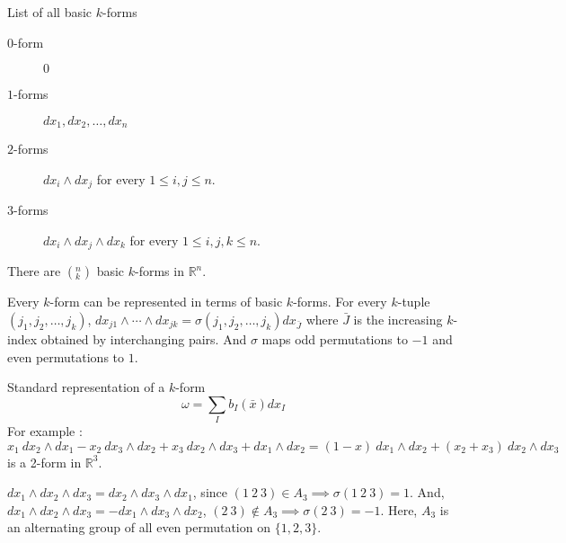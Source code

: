 \begin{remark} List of all basic $k$-forms
	\begin{description}
		\item[$0$-form] $0$
		\item[$1$-forms] $dx_1, dx_2, \dots, dx_n$
		\item[$2$-forms] $dx_i \wedge dx_j$ for every $1 \le i,j \le n$.
		\item[$3$-forms] $dx_i \wedge dx_j \wedge dx_k$ for every $1 \le i,j,k \le n$.
	\end{description}
\end{remark}
	
\begin{remark}
	There are $(^n_k)$ basic $k$-forms in $\mathbb{R}^n$.

	Every $k$-form can be represented in terms of basic $k$-forms.
	For every $k$-tuple $(j_1,j_2,\dots,j_k)$, $dx_{j1} \wedge \dotsm \wedge dx_{jk} = \sigma(j_1,j_2,\dots,j_k)dx_{\bar{J}}$ where $\bar{J}$ is the increasing $k$-index obtained by interchanging pairs.
	And $\sigma$ maps odd permutations to $-1$ and even permutations to $1$.

	Standard representation of a $k$-form
	\begin{equation}
		\omega = \sum_I b_I(\bar{x})dx_I
	\end{equation}
	For example : $x_1\ dx_2 \wedge dx_1 - x_2\ dx_3 \wedge dx_2 + x_3\ dx_2 \wedge dx_3 + dx_1 \wedge dx_2 = (1-x)\ dx_1 \wedge dx_2 + (x_2+x_3)\ dx_2 \wedge dx_3$ is a 2-form in $\mathbb{R}^3$.
\end{remark}

\begin{commentary}
	$dx_1 \wedge dx_2 \wedge dx_3 = dx_2 \wedge dx_3 \wedge dx_1$,
	since $(1\ 2\ 3) \in A_3 \implies \sigma(1\ 2\ 3) = 1$.
	And, $dx_1 \wedge dx_2 \wedge dx_3 = -dx_1 \wedge dx_3 \wedge dx_2$,
	$(2\ 3) \notin A_3 \implies \sigma(2\ 3) = -1$.
	Here, $A_3$ is an alternating group of all even permutation on $\{1,2,3\}$.
\end{commentary}

